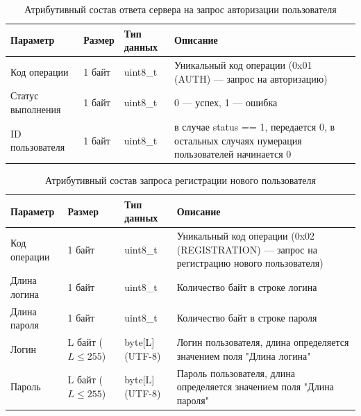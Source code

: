 \begin{table}[H]
    \centering
    \caption{Атрибутивный состав ответа сервера на запрос авторизации пользователя}
    \renewcommand{\arraystretch}{1.2}
    \begin{tabular}{|p{4cm}|p{2.2cm}|p{3cm}|p{6cm}|}
    \hline
    \textbf{Параметр} & \textbf{Размер} & \textbf{Тип данных} & \textbf{Описание} \\ \hline
    Код операции & 1 байт & uint8\_t & Уникальный код операции (0x01 (AUTH) — запрос на авторизацию) \\ \hline
    Статус выполнения & 1 байт & uint8\_t & 0 — успех, 1 — ошибка \\ \hline
    ID пользователя & 1 байт & uint8\_t & в случае status == 1, передается 0, в остальных случаях нумерация пользователей начинается 0 \\ \hline
    \end{tabular}
    \label{tab:auth_response}
\end{table}


\begin{table}[H]
    \centering
    \caption{Атрибутивный состав запроса регистрации нового пользователя}
    \begin{tabular}{|p{4cm}|p{2cm}|p{3cm}|p{6cm}|}
    \hline
    \textbf{Параметр} & \textbf{Размер} & \textbf{Тип данных} & \textbf{Описание} \\ \hline
    Код операции & 1 байт & uint8\_t & Уникальный код операции (0x02 (REGISTRATION) — запрос на регистрацию нового пользователя) \\ \hline
    Длина логина & 1 байт & uint8\_t & Количество байт в строке логина \\ \hline
    Длина пароля & 1 байт & uint8\_t & Количество байт в строке пароля \\ \hline
    Логин & L байт (\(L \le 255\)) & byte[L] (UTF-8) & Логин пользователя, длина определяется значением поля "Длина логина" \\ \hline
    Пароль & L байт (\(L \le 255\)) & byte[L] (UTF-8) & Пароль пользователя, длина определяется значением поля "Длина пароля" \\ \hline
    \end{tabular}
    \label{tab:register_request}
\end{table}

